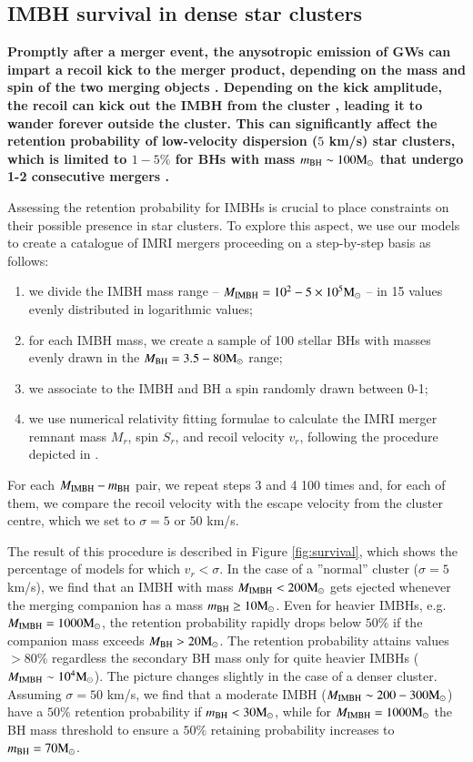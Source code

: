 \documentclass[article]{aa}
\newcommand{\Ms}{{\rm M}_\odot}
\newcommand{\ibh}{{\rm IMBH}}
\newcommand{\bh}{{\rm BH}}
\begin{document}
\subsection{IMBH survival in dense star clusters}
{\bf
Promptly after a merger event, the anysotropic emission of GWs can impart a recoil kick to the merger product, depending on the mass and spin of the two merging objects \citep{campanelli07,gonzalez07,lousto08,lousto12}. Depending on the kick amplitude, the recoil can kick out the IMBH from the cluster \citep[e.g.][]{bockelmann08}, leading it to wander forever outside the cluster. 
This can significantly affect the retention probability of low-velocity dispersion ($5$ km/s) star clusters, which is limited to $1-5\%$ for BHs with mass $m_\bh \sim 100 \Ms$ that undergo 1-2 consecutive mergers \citep{arca20}. 

Assessing the retention probability for IMBHs is crucial to place constraints on their possible presence in star clusters. To explore this aspect, we use our models to create a catalogue of IMRI mergers proceeding on a step-by-step basis as follows: 
\begin{enumerate}
\item we divide the IMBH mass range -- $M_\ibh = 10^2-5\times 10^5\Ms$ -- in 15 values evenly distributed in logarithmic values;
\item for each IMBH mass, we create a sample of 100 stellar BHs with masses evenly drawn in the $M_\bh = 3.5-80 \Ms$ range;
\item we associate to the IMBH and BH a spin randomly drawn between 0-1;
\item we use \cite{jimenez17} numerical relativity fitting formulae to calculate the IMRI merger remnant mass $M_r$, spin $S_r$, and recoil velocity $v_r$, following the procedure depicted in \cite{arca20}.
\end{enumerate}
For each $M_\ibh -m_\bh$ pair, we repeat steps 3 and 4 100 times and, for each of them, we compare the recoil velocity with the escape velocity from the cluster centre, which we set to $\sigma = 5$ or $50$ km/s. 

The result of this procedure is described in Figure \ref{fig:survival}, which shows the percentage of models for which $v_r < \sigma$. In the case of 
a ''normal'' cluster ($\sigma = 5$ km/s), we find that an IMBH with mass $M_\ibh < 200 \Ms$ gets ejected whenever the merging companion has a mass $m_\bh \geq 10 \Ms$. Even for heavier IMBHs, e.g. $M_\ibh = 1000\Ms$, the retention probability rapidly drops below $50\%$  if the companion mass exceeds $M_\bh > 20\Ms$. The retention probability attains values $>80\%$ regardless the secondary BH mass only for quite heavier IMBHs ($M_\ibh \sim 10^4\Ms$). The picture changes slightly in the case of a denser cluster. Assuming $\sigma=50$ km/s, we find that a moderate IMBH ($M_\ibh \sim 200-300 \Ms$) have a $50\%$ retention probability if $m_\bh < 30\Ms$, while for $M_\ibh = 1000\Ms$ the BH mass threshold to ensure a $50\%$ retaining probability increases to $m_\bh = 70\Ms$.

}
\end{document}
